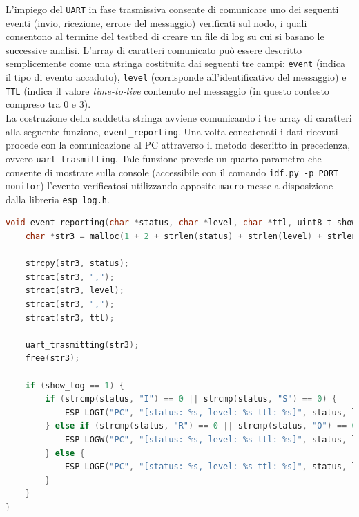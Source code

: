 \noindent L'impiego del \texttt{UART} in fase trasmissiva consente di comunicare uno dei seguenti eventi (invio, ricezione, errore del messaggio) verificati sul nodo, i quali consentono al termine del testbed di creare un file di log su cui si basano le successive analisi. L'array di caratteri comunicato può essere descritto semplicemente come una stringa costituita dai seguenti tre campi: \texttt{event} (indica il tipo di evento accaduto), \texttt{level} (corrisponde all'identificativo del messaggio) e \texttt{TTL} (indica il valore \textit{time-to-live} contenuto nel messaggio (in questo contesto compreso tra 0 e 3).\\
La costruzione della suddetta stringa avviene comunicando i tre array di caratteri alla seguente funzione, \texttt{event\_reporting}. Una volta concatenati i dati ricevuti procede con la comunicazione al PC attraverso il metodo descritto in precedenza, ovvero \texttt{uart\_trasmitting}. Tale funzione prevede un quarto parametro che consente di mostrare sulla console (accessibile con il comando \texttt{idf.py -p PORT monitor}) l'evento verificatosi utilizzando apposite \texttt{macro} messe a disposizione dalla libreria \texttt{esp\_log.h}.\\

\begin{lstlisting}[language=C, caption= costruzione stringa da inviare al PC tramite \texttt{uart\_trasmitting}]
void event_reporting(char *status, char *level, char *ttl, uint8_t show_log) {
    char *str3 = malloc(1 + 2 + strlen(status) + strlen(level) + strlen(status));// 1 end char; 2 for comma

    strcpy(str3, status);
    strcat(str3, ",");
    strcat(str3, level);
    strcat(str3, ",");
    strcat(str3, ttl);

    uart_trasmitting(str3);
    free(str3);

    if (show_log == 1) {
        if (strcmp(status, "I") == 0 || strcmp(status, "S") == 0) {
            ESP_LOGI("PC", "[status: %s, level: %s ttl: %s]", status, level, ttl);
        } else if (strcmp(status, "R") == 0 || strcmp(status, "O") == 0) {
            ESP_LOGW("PC", "[status: %s, level: %s ttl: %s]", status, level, ttl);
        } else {
            ESP_LOGE("PC", "[status: %s, level: %s ttl: %s]", status, level, ttl);
        }
    }
}
\end{lstlisting}

